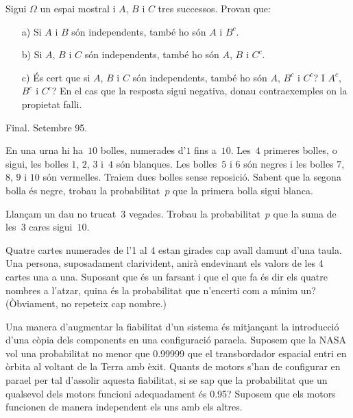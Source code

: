 \begin{prob}
{
Sigui $\Omega$ un espai mostral i $A$, $B$ i $C$ tres successos. Provau que:
\begin{itemize}
\item[a)] Si $A$ i $B$ s\'on independents, tamb\'e ho s\'on $A$ i 
${B}^c$.

\item[b)] Si $A$, $B$ i $C$ s\'on independents, tamb\'e ho s\'on $A$,
$B$ i ${C}^c$.

\item[c)] \'Es cert que si $A$, $B$ i $C$ s\'on independents, tamb\'e
ho s\'on $A$, ${B}^c$ i ${C}^c$? I ${A}^c$, 
${B}^c$ i ${C}^c$? En el cas que la resposta sigui
negativa, donau contraexemples on la propietat falli.
\end{itemize}
{\footnotesize Final. Setembre 95.}
}
\end{prob}

\begin{prob}
En una urna hi ha~$10$ bolles, numerades d'$1$ fins a~$10$. Les~$4$ primeres
bolles, o sigui, les bolles $1$, $2$, $3$ i~$4$ s\'on blanques. Les bolles~$5$ 
i $6$ s\'on negres i les bolles $7$, $8$, $9$ i $10$ s\'on vermelles.
Traiem dues bolles sense reposici\'o. Sabent que la segona bolla \'es
negre, trobau la probabilitat~$p$ que la primera bolla sigui blanca.
\end{prob}

\begin{prob}
{
Llan\c{c}am un dau no trucat~$3$ vegades. Trobau la probabilitat~$p$ 
que la suma de les~$3$ cares sigui~$10$.
}
\end{prob}

\begin{prob} {Quatre cartes numerades de l'1 al 4 estan girades cap avall damunt
d'una taula. Una persona, suposadament clarivident, anir\`a endevinant els valors
de les 4 cartes una a una. Suposant que \'es un farsant i que el que fa \'es dir
els quatre nombres a l'atzar, quina \'es la probabilitat que n'encerti com a
m\'{\i}nim un? (\`Obviament, no repeteix cap nombre.)} \end{prob}

\begin{prob} {Una manera d'augmentar la fiabilitat d'un sistema \'es
mitjan\c{c}ant la introducci\'o d'una c\`opia dels components en una
configuraci\'o para{\lgem}ela. Suposem que la NASA vol una probabilitat no menor que
0.99999 que el transbordador espacial entri en \`orbita al voltant de la Terra
amb \`exit. Quants de motors s'han de configurar en para{\lgem}el per tal d'assolir
aquesta fiabilitat, si se sap que la probabilitat que un qualsevol dels motors
funcioni adequadament \'es 0.95? Suposem que els motors funcionen de manera
independent els uns amb els altres.} 
\end{prob}

